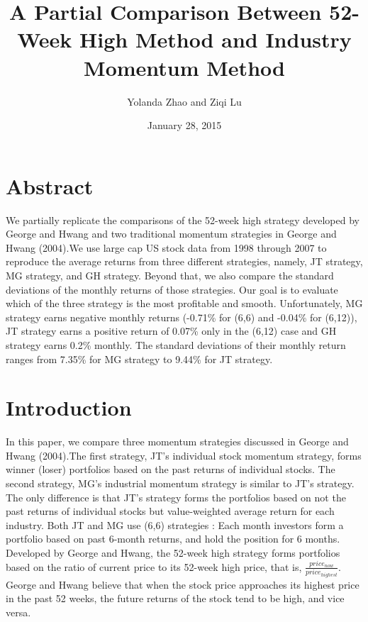 \documentclass{article}
\title{A Partial Comparison Between 52-Week High Method and Industry Momentum Method}
\author{Yolanda Zhao and Ziqi Lu}
\date{January 28, 2015}
\begin{document}

\maketitle


\pagebreak


\section{Abstract}


We partially replicate the comparisons of the 52-week high strategy developed by George and Hwang and two traditional momentum strategies in George and Hwang (2004).We use large cap US stock data from 1998 through 2007 to reproduce the average returns from three different strategies, namely, JT strategy, MG strategy, and GH strategy. Beyond that, we also compare the standard deviations of the monthly returns of those strategies. Our goal is to evaluate which of the three strategy is the most profitable and smooth. Unfortunately, MG strategy earns negative monthly returns (-0.71\% for (6,6) and -0.04\% for (6,12)), JT strategy earns a positive return of 0.07\% only in the (6,12) case and GH strategy earns 0.2\% monthly. The standard deviations of their monthly return ranges from 7.35\% for MG strategy to 9.44\% for JT strategy.

\pagebreak

\section{Introduction}


In this paper, we compare three momentum strategies discussed in George and Hwang (2004).The first strategy, JT's individual stock momentum strategy, forms winner (loser) portfolios based on the past returns of individual stocks. The second strategy, MG's industrial momentum strategy is similar to JT's strategy. The only difference is that JT's strategy forms the portfolios based on not the past returns of individual stocks but value-weighted average return for each industry. Both JT and MG use (6,6) strategies : Each month investors form a portfolio based on past 6-month returns, and hold the position for 6 months. Developed by George and Hwang, the 52-week high strategy forms portfolios based on the ratio of current price to its 52-week high price, that is, $\frac{price_{now}}{price_{highest}}$. George and Hwang believe that when the stock price approaches its highest price in the past 52 weeks, the future returns of the stock tend to be high, and vice versa.
\end{document}
